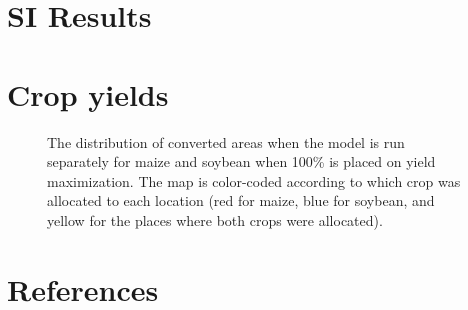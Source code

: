 \documentclass[a4paper]{article}
\begin{document}
\section*{\Large SI Results}

\section*{\large Crop yields}

\begin{figure}[!ht]
       \begin{center}
        \end{center}
      \caption{The distribution of converted areas when the model is run separately for maize and soybean when 100\% is placed on yield maximization. The map is color-coded according to which crop was allocated to each location (red for maize, blue for soybean, and yellow for the places where both crops were allocated).}
      \label{fig:default}
\end{figure}


\section*{\large References}
 

\end{document}
